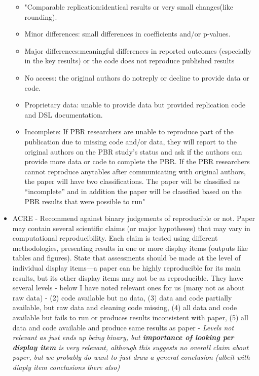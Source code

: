 \begin{itemize}
    \begin{itemize}
        \item "Comparable replication:identical results or very small changes(like rounding).
        \item Minor differences: small differences in coefficients and/or p-values.
        \item  Major differences:meaningful differences in reported outcomes (especially in the key results) or the code does not reproduce published results
        \item No access: the original authors do notreply or decline to provide data or code.
        \item Proprietary data: unable to provide data but provided replication code and DSL documentation.
        \item Incomplete: If PBR researchers are unable to reproduce part of the publication due to missing code and/or data, they will report to the original authors on the PBR study’s status and ask if the authors can provide more data or code to complete the PBR. If the PBR researchers cannot reproduce anytables after communicating with original authors, the paper will have two classifications. The paper will be classified as “incomplete” and in addition the paper will be classified based on the PBR results that were possible to run"\autocite{wood_push_2018, wood_replication_2018}
    \end{itemize}
    \item ACRE - Recommend against binary judgements of reproducible or not. Paper may contain several scientific claims (or major hypotheses) that may vary in computational reproducibility. Each claim is tested using different methodologies, presenting results in one or more display items (outputs like tables and figures). State that assessments should be made at the level of individual display items—a paper can be highly reproducible for its main results, but its other display items may not be as reproducible. They have several levels - below I have noted relevant ones for us (many not as about raw data) - (2) code available but no data, (3) data and code partially available, but raw data and cleaning code missing, (4) all data and code available but fails to run or produces results inconsistent with paper, (5) all data and code available and produce same results as paper\autocite{berkeley_initiative_for_transparency_in_the_social_sciences_guide_2022} - \textit{Levels not relevant as just ends up being binary, but \textbf{importance of looking per display item} is very relevant, although this suggests no overall claim about paper, but we probably do want to just draw a general conclusion (albeit with diaply item conclusions there also)}

\end{itemize}
